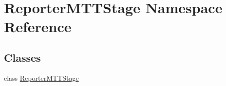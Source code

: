 \hypertarget{namespace_reporter_m_t_t_stage}{\section{Reporter\-M\-T\-T\-Stage Namespace Reference}
\label{namespace_reporter_m_t_t_stage}
}
\subsection*{Classes}
\begin{DoxyCompactItemize}
\item 
class \hyperlink{class_reporter_m_t_t_stage_1_1_reporter_m_t_t_stage}{Reporter\-M\-T\-T\-Stage}
\end{DoxyCompactItemize}
